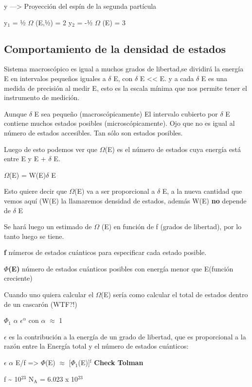 \documentclass[11pt]{article}
\begin{document}
y ---> Proyección del espín de la segunda partícula

y$_{\text{1}}$ = ½     $\Omega$ (E,½) = 2
y$_{\text{2}}$ = -½    $\Omega$ (E)   = 3
\subsection{Comportamiento de la densidad de estados}
\label{sec-1-5}

Sistema macroscópico es igual a muchos grados de libertad,se dividirá
la energía E en intervalos pequeños iguales a $\delta$ E, con $\delta$ E
<< E. y a cada $\delta$ E es una medida de precisión al medir E, esto es
la escala mínima que nos permite tener el instrumento de medición.

Aunque $\delta$ E sea pequeño (macroscópicamente) El intervalo cubierto
por $\delta$ E contiene muchos estados posibles (microscópicamente). Ojo
que no es igual al número de estados accesibles. Tan sólo son estados
posibles.

Luego de esto podemos ver que $\Omega$(E) es el número de estados cuya
energía está entre E y E + $\delta$ E.


$\Omega$(E) = W(E)$\delta$ E

Esto quiere decir que $\Omega$(E) va a ser
proporcional a $\delta$ E, a la nueva cantidad que vemos aquí (W(E) la
llamaremos densidad de estados, además W(E) \textbf{no} depende de $\delta$ E

Se hará luego un estimado de $\Omega$ (E) en función de f (grados de
libertad), por lo tanto luego se tiene.

\textbf{f} números de estados cuánticos para especificar cada estado posible.

\textbf{$\Phi$(E)} número de estados cuánticos posibles con energía menor que
E(función creciente)

Cuando uno quiera calcular el $\Omega$(E) sería como calcular el total
de estados dentro de un cascarón (WTF?!)

$\Phi$$_{\text{1}}$ $\alpha$ $\epsilon$$^{\alpha}$   con $\alpha$ $\approx$ 1

$\epsilon$ es la contribución a la energía de un grado de libertad, que
es proporcional a la razón entre la Energía total y el número de
estados cuánticos:

$\epsilon$ $\alpha$ E/f => $\Phi$(E) $\approx$ [$\Phi$$_{\text{1}}$(E)]$^{\text{f}}$ \textbf{Check Tolman}

f \textasciitilde{} 10$^{\text{23}}$  N$_{\text{A}}$ = 6.023 x 10$^{\text{23}}$
\end{document}
